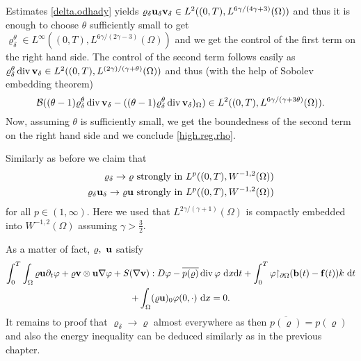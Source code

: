 \documentclass{article}
\DeclareMathOperator{\diver}{div}
\newcommand{\bb}{{\bf b}}
\newcommand{\vb}{\bb}
\newcommand{\vf}{{\bf f}}
\newcommand{\bu}{{\bf u}}
\newcommand{\vu}{\bu}
\newcommand{\bv}{{\bf v}}
\newcommand{\vv}{\bv}
\newcommand{\pat}{\partial_t}
\numberwithin{equation}{section}
\begin{document}
Estimates \eqref{delta.odhady} yields $\varrho_\delta \vu_\delta \vv_\delta \in L^2((0,T),L^{6\gamma/(4\gamma + 3)}(\Omega))$ and thus  it is enough to choose $\theta$ sufficiently small to get $\varrho_\delta^\theta\in L^\infty ((0,T), L^{6\gamma/(2\gamma - 3)}(\Omega))$ and we get the control of the first term on the right hand side. The control of the second term follows easily as $\varrho_\delta^\theta\diver \vv_\delta \in L^2((0,T),L^{(2\gamma)/(\gamma+\theta)}(\Omega))$ and thus (with the help of Sobolev embedding theorem)
$$
\mathcal B ((\theta - 1)\varrho_\delta^\theta \diver \vv_\delta - ((\theta -1)\varrho_\delta^\theta \diver \vv_\delta)_\Omega) \in L^2((0,T), L^{6\gamma/(\gamma + 3\theta)}(\Omega)).
$$
Now, assuming $\theta$ is sufficiently small, we get the boundedness of the second term on the right hand side and we conclude \eqref{high.reg.rho}.

Similarly as before we claim that
\begin{equation*}
\begin{split}
\varrho_\delta \to \varrho\ \mbox{strongly in }L^p((0,T),W^{-1,2}(\Omega))\\
\varrho_\delta \vu_\delta \to \varrho \vu \ \mbox{strongly in }L^p((0,T),W^{-1,2}(\Omega))
\end{split}
\end{equation*}
for all $p\in (1,\infty)$. Here we used that $L^{2\gamma/(\gamma+1)}(\Omega)$ is compactly embedded into $W^{-1,2}(\Omega)$ assuming $\gamma>\frac32$. 

As a matter of fact, $\varrho,\ \vu$ satisfy
\begin{multline*}
\int_0^T\int_\Omega \varrho \vu \pat \varphi  + \varrho \vv \otimes \vu \nabla \varphi + S(\nabla \vv):D \varphi - \overline{p(\varrho)}\diver \varphi \ {\rm d}x{\rm d}t + \int_0^T \varphi{\restriction_{\partial \Omega}}(\vb(t) - \vf(t))k\ {\rm d}t\\
%
+ \int_\Omega (\varrho \vu)_0 \varphi(0,\cdot)\ {\rm d}x = 0. 
\end{multline*}
It remains to proof that $\varrho_\delta \to \varrho$ almost everywhere as then $\overline{p(\varrho)} = p(\varrho)$ and also the energy inequality can be deduced similarly as in the previous chapter.
\end{document}
